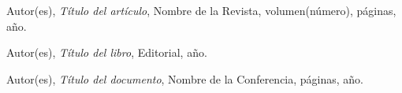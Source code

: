 \documentclass[a4paper,12pt]{article}
\begin{document}
\newpage
\begin{thebibliography}{99}
Autor(es), \emph{Título del artículo}, Nombre de la Revista, volumen(número), páginas, año.

Autor(es), \emph{Título del libro}, Editorial, año.

Autor(es), \emph{Título del documento}, Nombre de la Conferencia, páginas, año.
\end{thebibliography}
\end{document}
